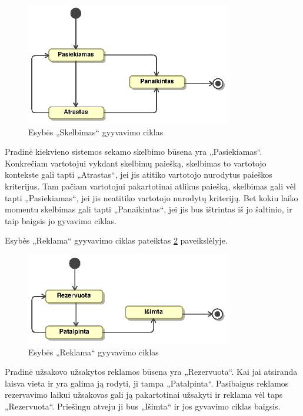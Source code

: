 \documentclass[12pt]{article}
\begin{document}
	\begin{figure}[h]
		\begin{center}
			\includegraphics[width=0.8\textwidth]{SkelbimoBusena.eps}
			\caption{Esybės „Skelbimas“ gyyvavimo ciklas\label{AdvertState}}
		\end{center}
	\end{figure}
	
	Pradinė kiekvieno sistemos sekamo skelbimo būsena yra „Pasiekiamas“. Konkrečiam vartotojui vykdant skelbimų paiešką, skelbimas to vartotojo kontekste gali tapti „Atrastas“, jei jis atitiko vartotojo nurodytus paieškos kriterijus. Tam pačiam vartotojui pakartotinai atlikus paiešką, skelbimas gali vėl tapti „Pasiekiamas“, jei jis neatitiko vartotojo nurodytų kriterijų. Bet kokiu laiko momentu skelbimas gali tapti „Panaikintas“, jei jis bus ištrintas iš jo šaltinio, ir taip baigsis jo gyvavimo ciklas.
	\pagebreak	
	
	Esybės „Reklama“ gyyvavimo ciklas pateiktas \ref{AdState} paveikslėlyje.
	
	\begin{figure}[h]
		\begin{center}
			\includegraphics[width=0.8\textwidth]{ReklamosBusena.eps}
			\caption{Esybės „Reklama“ gyyvavimo ciklas\label{AdState}}
		\end{center}
	\end{figure}
	
	Pradinė užsakovo užsakytos reklamos būsena yra „Rezervuota“. Kai jai atsiranda laisva vieta ir yra galima ją rodyti, ji tampa „Patalpinta“. Pasibaigus reklamos rezervavimo laikui užsakovas gali ją pakartotinai užsakyti ir reklama vėl taps „Rezervuota“. Priešingu atveju ji bus „Išimta“ ir jos gyvavimo ciklas baigsis.
	\pagebreak	
	
\end{document}
